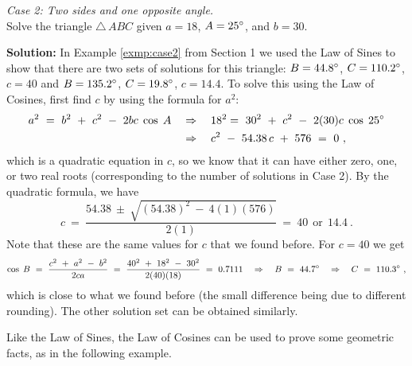 \begin{exmp}\label{exmp:case2cosine}
 \emph{Case 2: Two sides and one opposite angle.}\\Solve the triangle $\triangle\,ABC$ given
 $a = 18$, $A = 25^\circ$, and $b = 30$.\vspace{1mm}
 \par\noindent\textbf{Solution:} In Example \ref{exmp:case2} from Section 1 we used the Law of Sines
 to show that there are
 two sets of solutions for this triangle: $B = 44.8^\circ$, $C = 110.2^\circ$, $c = 40$ and
 $B = 135.2^\circ$, $C = 19.8^\circ$, $c = 14.4$. To solve this using the Law of Cosines, first
 find $c$ by using the formula for $a^2$:
 \begin{align*}
  a^2 ~ = ~ b^2 ~ + ~ c^2 ~ - ~ 2bc\;\cos\;A \quad&\Rightarrow\quad
  18^2 = ~ 30^2 ~ + ~ c^2 ~ - ~ 2(30)c\;\cos\;25^\circ\\
  &\Rightarrow\quad c^2 ~-~ 54.38\,c ~+~ 576 ~ = ~ 0 ~,
 \end{align*}
 which is a quadratic equation in $c$, so we know that it can have either zero, one, or two real
 roots (corresponding to the number of solutions in Case 2). By the quadratic formula, we have
 \begin{displaymath}
  c ~=~ \frac{54.38 ~\pm~ \sqrt{(54.38)^2 ~-~ 4(1)(576)}}{2(1)} ~=~ 40 ~~\text{or}~~ 14.4 ~.
 \end{displaymath}
 Note that these are the same values for $c$ that we found before. For $c=40$ we get
 \begin{displaymath}
  \cos\;B ~=~ \frac{c^2 ~ + ~ a^2 ~-~ b^2}{2ca} ~=~
  \frac{40^2 ~ + ~ 18^2 ~-~ 30^2}{2(40)(18)} ~=~ 0.7111
  \quad\Rightarrow\quad B ~=~ 44.7^\circ \quad\Rightarrow\quad C ~=~ 110.3^\circ ~,
 \end{displaymath}
 which is close to what we found before (the small difference being due to different rounding). The
 other solution set can be obtained similarly.
\end{exmp}\vspace{-3mm}
\divider

Like the Law of Sines, the Law of Cosines can be used to prove some geometric facts, as in the
following example.\vspace{-1mm}

